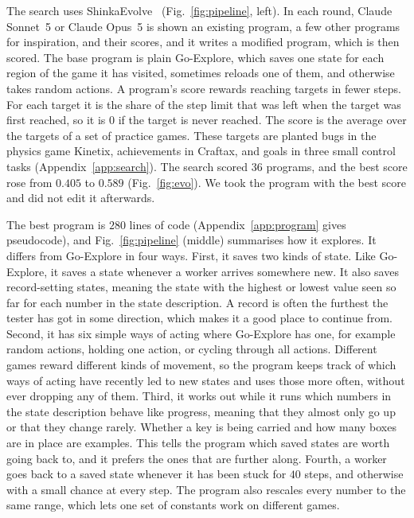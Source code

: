 \documentclass{article}
\begin{document}
The search uses ShinkaEvolve~\citep{shinkaevolve} (Fig.~\ref{fig:pipeline}, left). In each round, Claude Sonnet~5 or
Claude Opus~5 is shown an existing program, a few other programs for inspiration, and their scores, and it writes a
modified program, which is then scored. The base program is plain Go-Explore, which saves one state for each region of
the game it has visited, sometimes reloads one of them, and otherwise takes random actions. A program's score rewards reaching targets in fewer steps. For each target it is the share of the step limit that was left when the target was first reached, so it is $0$ if the target is never reached. The score is the average over the targets of a set of practice games. These targets are planted bugs in the physics game Kinetix, achievements in Craftax, and goals in three small control tasks (Appendix~\ref{app:search}). The search scored $36$ programs, and the best score rose from $0.405$ to $0.589$
(Fig.~\ref{fig:evo}). We took the program with the best score and did not edit it afterwards.

The best program is $280$ lines of code (Appendix~\ref{app:program} gives pseudocode), and Fig.~\ref{fig:pipeline}
(middle) summarises how it explores. It differs from Go-Explore in four ways. First, it saves two kinds of state. Like
Go-Explore, it saves a state whenever a worker arrives somewhere new. It also saves record-setting states, meaning the
state with the highest or lowest value seen so far for each number in the state description. A record is often the
furthest the tester has got in some direction, which makes it a good place to continue from. Second, it has six simple
ways of acting where Go-Explore has one, for example random actions, holding one action, or cycling through all
actions. Different games reward different kinds of movement, so the program keeps track of which ways of acting have
recently led to new states and uses those more often, without ever dropping any of them. Third, it works out while it runs which numbers in the
state description behave like progress, meaning that they almost only go up or that they change rarely. Whether a key
is being carried and how many boxes are in place are examples. This tells the program which saved states are worth
going back to, and it prefers the ones that are further along. Fourth, a worker goes back to a saved state whenever it
has been stuck for $40$ steps, and otherwise with a small chance at every step. The program also rescales every number to
the same range, which lets one set of constants work on different games.
\end{document}

